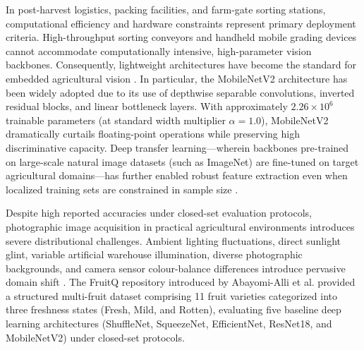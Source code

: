 In post-harvest logistics, packing facilities, and farm-gate sorting stations, computational efficiency and hardware constraints represent primary deployment criteria. High-throughput sorting conveyors and handheld mobile grading devices cannot accommodate computationally intensive, high-parameter vision backbones. Consequently, lightweight architectures have become the standard for embedded agricultural vision \cite{chen2024classification}. In particular, the MobileNetV2 architecture \cite{sandler2018mobilenetv2} has been widely adopted due to its use of depthwise separable convolutions, inverted residual blocks, and linear bottleneck layers. With approximately $2.26\times 10^6$ trainable parameters (at standard width multiplier $\alpha=1.0$), MobileNetV2 dramatically curtails floating-point operations while preserving high discriminative capacity. Deep transfer learning---wherein backbones pre-trained on large-scale natural image datasets (such as ImageNet) are fine-tuned on target agricultural domains---has further enabled robust feature extraction even when localized training sets are constrained in sample size \cite{gulzar2023fruit,chen2024classification}.

Despite high reported accuracies under closed-set evaluation protocols, photographic image acquisition in practical agricultural environments introduces severe distributional challenges. Ambient lighting fluctuations, direct sunlight glint, variable artificial warehouse illumination, diverse photographic backgrounds, and camera sensor colour-balance differences introduce pervasive domain shift \cite{abayomi2024fruitq,sultana2022extensive}. The FruitQ repository introduced by Abayomi-Alli et al. \cite{abayomi2024fruitq} provided a structured multi-fruit dataset comprising 11 fruit varieties categorized into three freshness states (Fresh, Mild, and Rotten), evaluating five baseline deep learning architectures (ShuffleNet, SqueezeNet, EfficientNet, ResNet18, and MobileNetV2) under closed-set protocols.

